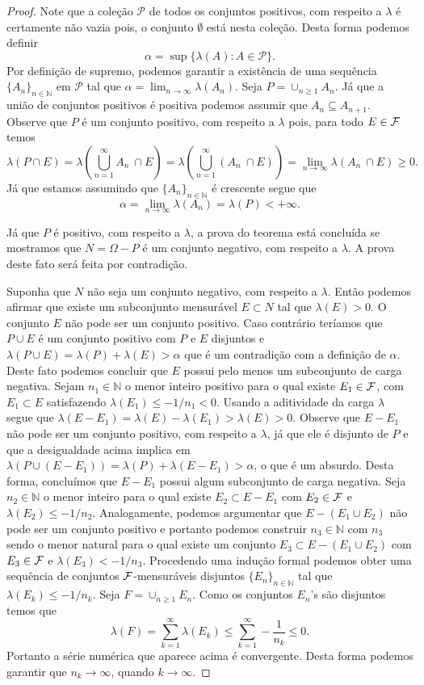 \begin{proof}
Note que a coleção $\mathscr{P}$ de todos os conjuntos positivos, 
com respeito a $\lambda$ é certamente não vazia pois,
o conjunto $\emptyset$ está nesta coleção. Desta forma 
podemos definir 
\[
\alpha = \sup \{ \lambda(A): A\in\mathscr{P}   \}.
\]
Por definição de supremo, podemos garantir a existência de uma
sequência $\{A_n\}_{n\in\mathbb{N}}$ em $\mathscr{P}$ tal que 
$\alpha = \lim_{n\to\infty} \lambda(A_n)$.
Seja $P=\cup_{n\geq 1}A_n$. Já que a união de conjuntos 
positivos é positiva podemos assumir que $A_n\subseteq A_{n+1}$.
Observe que $P$ é um conjunto positivo, com respeito a $\lambda$
pois, para todo $E\in\mathcal{F}$ temos 
\[
\lambda(P\cap E)
=
\lambda\left( \bigcup_{n=1}^{\infty} A_n \ \cap E \right)
=
\lambda\left( \bigcup_{n=1}^{\infty} (A_n \ \cap E) \right)
=
\lim_{n\to\infty} \lambda(A_n \ \cap E)
\geq 
0.
\]
Já que estamos assumindo que $\{A_n\}_{n\in\mathbb{N}}$ é 
crescente segue que 
\[
\alpha = \lim_{n\to\infty} \lambda(A_n)= \lambda(P)<+\infty.
\]

Já que $P$ é positivo, com respeito a $\lambda$, a 
prova do teorema está concluída se mostramos que 
$N=\Omega-P$ é um conjunto negativo, com respeito a 
$\lambda$. A prova deste fato será feita por contradição.

Suponha que $N$ não seja um conjunto negativo, com respeito 
a $\lambda$. Então podemos afirmar que existe um subconjunto 
mensurável $E\subset N$ tal que $\lambda(E)>0$. 
O conjunto $E$ não pode ser um conjunto positivo.
Caso contrário teríamos que $P\cup E$ é um conjunto 
positivo com $P$ e $E$ disjuntos e
$\lambda(P\cup E)=\lambda(P)+\lambda(E)>\alpha$
que é um contradição com a definição de $\alpha$.
Deste fato podemos concluir que $E$ possui pelo 
menos um subconjunto de carga negativa. 
Sejam $n_1\in \mathbb{N}$ o menor inteiro positivo para o qual 
existe $E_1\in \mathcal{F}$, com $E_1\subset E$ 
satisfazendo $\lambda(E_1)\leq -1/n_1<0$.
Usando a aditividade da carga $\lambda$ segue que 
$\lambda(E-E_1)=\lambda(E)-\lambda(E_1)>\lambda(E)>0$.
Observe que $E-E_1$ não pode ser um conjunto positivo,
com respeito a $\lambda$, já que ele é disjunto 
de $P$ e que a desigualdade acima implica em 
$\lambda(P\cup (E-E_1))= \lambda(P)+\lambda(E-E_1) >\alpha$,
o que é um absurdo. 
Desta forma, concluímos que $E-E_1$ possui algum subconjunto de 
carga negativa. Seja $n_2\in\mathbb{N}$ o menor inteiro para o
qual existe $E_2\subset E-E_1$ com $E_2\in \mathcal{F}$ e 
$\lambda(E_2)\leq -1/n_2$. Analogamente, podemos 
argumentar que $E-(E_1\cup E_2)$ não pode ser um conjunto 
positivo e portanto podemos construir 
$n_3\in\mathbb{N}$ com $n_3$ sendo o menor 
natural para o qual existe um conjunto 
$E_3\subset E-(E_1\cup E_2)$ com $E_3\in \mathcal{F}$ e 
$\lambda(E_3)<-1/n_3$. Procedendo uma indução 
formal podemos obter uma sequência de conjuntos 
$\mathcal{F}$-mensuráveis disjuntos $\{E_n\}_{n\in\mathbb{N}}$
tal que $\lambda(E_k)\leq -1/n_k$.
Seja $F=\cup_{n\geq 1} E_n$. Como os conjuntos $E_n$'s são disjuntos
temos que 
\[
\lambda(F)
=
\sum_{k=1}^{\infty}\lambda(E_k)
\leq 
\sum_{k=1}^{\infty} -\frac{1}{n_k}
\leq 
0.
\]
Portanto a série numérica que aparece acima é convergente.
Desta forma podemos garantir que $n_k\to \infty$, quando $k\to\infty$.


\end{proof}
